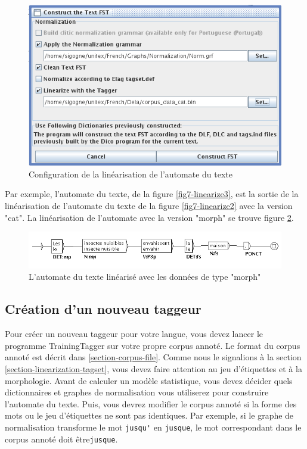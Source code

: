 \begin{figure}[!ht]
\begin{center}
\includegraphics[width=13cm]{resources/img/fig7-linearize1.png}
\caption{Configuration de la linéarisation de l'automate du texte\label{fig7-linearize1}}
\end{center}
\end{figure}

\bigskip
\noindent Par exemple, l'automate du texte, de la figure \ref{fig7-linearize3}, est la sortie de la  linéarisation de l'automate du texte de la figure \ref{fig7-linearize2} avec la version "cat".
La linéarisation de l'automate avec la version "morph" se trouve figure \ref{fig7-linearize4}.

\begin{figure}[!ht]
\begin{center}
\includegraphics[width=16cm]{resources/img/fig7-linearize4.png}
\caption{L'automate du texte linéarisé avec les données de type "morph"\label{fig7-linearize4}}
\end{center}
\end{figure}

\subsection{Création d'un nouveau taggeur}
Pour créer un nouveau taggeur pour votre langue, vous devez lancer le programme TrainingTagger sur
votre propre corpus annoté. Le format du corpus annoté est décrit dans \ref{section-corpus-file}.
Comme nous le signalions à la section \ref{section-linearization-tagset}, 
vous devez faire attention au jeu d'étiquettes et à la morphologie. Avant de calculer un modèle
statistique, vous devez décider quels dictionnaires et graphes de normalisation vous utiliserez pour
construire l'automate du texte. Puis, vous devrez modifier le corpus annoté si la forme des mots ou
le jeu d'étiquettes ne sont pas identiques. Par exemple, si le graphe de  normalisation transforme
le mot \verb+jusqu'+ en \verb+jusque+, le mot correspondant dans le  corpus annoté doit
être\verb+jusque+. 

